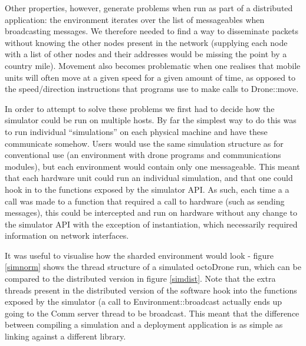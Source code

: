 Other properties, however, generate problems when run as part of a distributed application: the environment iterates over the list of messageables when broadcasting messages. We therefore needed to find a way to disseminate packets without knowing the other nodes present in the network (supplying each node with a list of other nodes and their addresses would be missing the point by a country mile). Movement also becomes problematic when one realises that mobile units will often move at a given speed for a given amount of time, as opposed to the speed/direction instructions that programs use to make calls to Drone::move.

In order to attempt to solve these problems we first had to decide how the simulator could be run on multiple hosts. By far the simplest way to do this was to run individual ``simulations'' on each physical machine and have these communicate somehow. Users would use the same simulation structure as for conventional use (an environment with drone programs and communications modules), but each environment would contain only one messageable. This meant that each hardware unit could run an individual simulation, and that one could hook in to the functions exposed by the simulator API. As such, each time a a call was made to a function that required a call to hardware (such as sending messages), this could be intercepted and run on hardware without any change to the simulator API with the exception of instantiation, which necessarily required information on network interfaces. 

It was useful to visualise how the sharded environment would look - figure \ref{simnorm} shows the thread structure of a simulated octoDrone run, which can be compared to the distributed version in figure \ref{simdist}. Note that the extra threads present in the distributed version of the software hook into the functions exposed by the simulator (a call to Environment::broadcast actually ends up going to the Comm server thread to be broadcast. This meant that the difference between compiling a simulation and a deployment application is as simple as linking against a different library.

